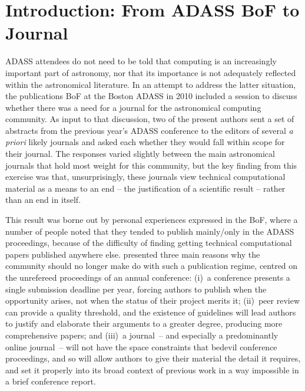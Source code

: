 \section{Introduction: From ADASS BoF to Journal}

ADASS attendees do not need to be told that computing is an increasingly important part of astronomy, nor that its importance is not adequately reflected within the astronomical literature. In an attempt to address the latter situation, the publications BoF at the Boston ADASS in 2010 included a session to discuss whether there was a need for a journal for the astronomical computing community. 
As input to that discussion, two of the present authors sent a set of abstracts from the previous year's ADASS conference to the editors of several {\em a priori\/} likely journals and asked each whether they would fall within scope for their journal. The responses \citep[summarised by][]{graymann} varied slightly between the main astronomical journals that hold most weight for this community, but the key finding from this exercise was that, unsurprisingly, these journals view technical computational material as a means to an end -- the justification of a scientific result -- rather than an end in itself. 

This result was borne out by personal experiences expressed in the BoF, where a number of people noted that they tended to publish mainly/only in the ADASS proceedings, because of the difficulty of finding getting technical computational papers published anywhere else. 
\cite{graymann} presented three main reasons why the community should no longer make do
 with such a publication regime, centred on the unrefereed
proceedings of an annual conference: (i)~a conference presents a
single submission deadline per year, forcing authors to publish when
the opportunity arises, not when the status of their project merits
it; (ii)~peer review can provide a quality threshold, and the
existence of guidelines will lead authors to justify and elaborate
their arguments to a greater degree, producing more comprehensive
papers; and (iii)~a journal~-- and especially a predominantly online
journal~-- will not have the space constraints that bedevil conference
proceedings, and so will allow authors to give their material the
detail it requires, and set it properly into its broad context of
previous work in a way impossible in a brief conference
report.

